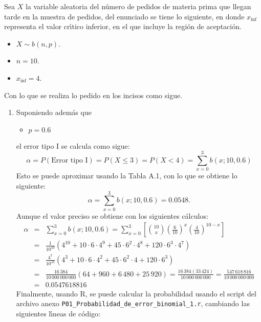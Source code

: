 \begin{solucion}
 Sea $X$ la variable aleatoria del n\'umero de pedidos de materia prima que llegan tarde en la muestra de pedidos, del enunciado se tiene lo siguiente, en donde $x_{\text{inf}}$ representa el valor cr\'{\i}tico inferior, en el que incluye la regi\'on de aceptaci\'on.
 \begin{itemize}
  \item $X \sim b(n,p)$.
  \item $n = 10$.
  \item $x_{\text{inf}} = 4$.
 \end{itemize}
 Con lo que se realiza lo pedido en los incisos como sigue.
 \begin{enumerate}
  \item Suponiendo adem\'as que
  \begin{itemize}
   \item $p=0.6$
  \end{itemize}
  el error tipo I se calcula como sigue:
  \begin{equation*}
   \alpha = P(\text{Error tipo I}) = P(X \leq 3) = P(X < 4) = \sum_{x=0}^{3} b(x;10,0.6)
  \end{equation*}
  Esto se puede aproximar usando la Tabla A.1, con lo que se obtiene lo siguiente:
  \begin{equation*}
   \alpha = \sum_{x=0}^{3} b(x;10,0.6) = 0.0548.
  \end{equation*}
  Aunque el valor preciso se obtiene con los siguientes c\'alculos:
  \begin{eqnarray*}
   \alpha & = & \sum_{x=0}^{3} b(x;10,0.6) = \sum_{x=0}^{3} \left[ \binom{10}{x} \left( \frac{6}{10} \right)^x \left( \frac{4}{10} \right)^{10-x} \right] \\
   & = & \frac{1}{10^{10}} \left( 4^{10} + 10\cdot 6 \cdot 4^9 + 45\cdot 6^2 \cdot 4^8 + 120 \cdot 6^3 \cdot 4^7 \right) \\
   & = & \frac{4^7}{10^{10}}\left( 4^3 + 10\cdot 6 \cdot 4^2 + 45\cdot 6^2 \cdot 4 + 120 \cdot 6^3 \right) \\
   & = & \frac{16\,384}{10\,000\,000\,000}(64 + 960 + 6\,480 + 25\,920) = \frac{16\,384(33\,424)}{10\,000\,000\,000} = \frac{547\,618\,816}{10\,000\,000\,000} \\
   & = & 0.0547618816
  \end{eqnarray*}
  Finalmente, usando R, se puede calcular la probabilidad usando el script del archivo anexo \texttt{P01\_Probabilidad\_de\_error\_binomial\_1.r}, cambiando las siguientes l\'{\i}neas de c\'odigo:

\end{enumerate}
\end{solucion}
